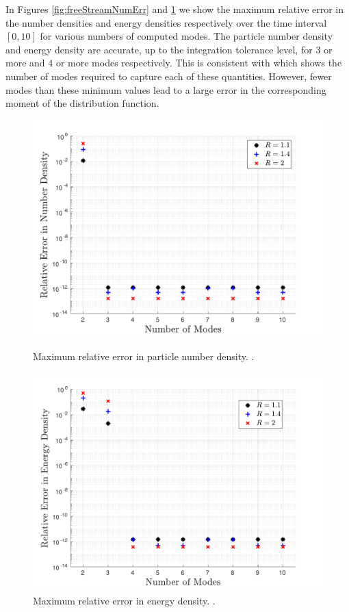 In Figures \ref{fig:freeStreamNumErr} and  \ref{fig:freeStreamEerr} we show the maximum relative error in the number densities and energy densities respectively over the time interval $[0,10]$ for various numbers of computed modes.  The particle number density and energy density are accurate, up to the integration tolerance level, for $3$ or more and $4$ or more modes respectively. This is consistent with  which shows the number of modes required to capture each of these quantities. However, fewer modes than these minimum values lead to a large error in the corresponding moment of the distribution function.
\begin{figure}
\centerline{\includegraphics[width=0.8\linewidth]{06-appendix/SpectralMethodBoltzmann/Figures/free_stream_num_err.pdf}}
\caption{Maximum relative error in particle number density. .}\label{fig:freeStreamNumErr}
\centerline{\includegraphics[width=0.8\linewidth]{06-appendix/SpectralMethodBoltzmann/Figures/free_stream_E_err.pdf}}
\caption{Maximum relative error in energy density. .}\label{fig:freeStreamEerr}
\end{figure}

